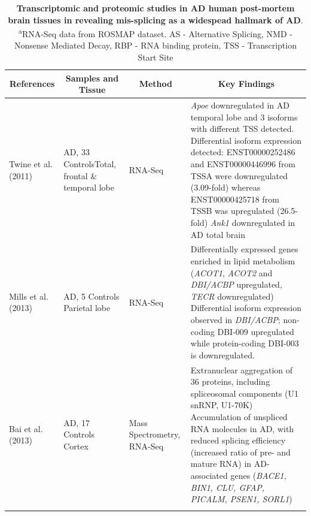 \begin{changemargin}{1.5cm}
	\begin{landscape}
		\small %
		\setlength\tabcolsep{2pt} %
		\renewcommand{\arraystretch}{1}
		\begin{longtable}[c]{p{3cm}p{4cm}p{3cm}p{16cm}}
			\caption[Transcriptomic and Proteomic Studies in AD]%
			{\textbf{Transcriptomic and proteomic studies in AD human post-mortem brain tissues in revealing mis-splicing as a widespead hallmark of AD}. \textsuperscript{a}RNA-Seq data from ROSMAP dataset. AS - Alternative Splicing, NMD - Nonsense Mediated Decay, RBP - RNA binding protein, TSS - Transcription Start Site}
			\label{tab: AS_ADHuman_studies}\\
			
			\toprule
			\multicolumn{1}{c}{References} &
			\multicolumn{1}{c}{Samples and Tissue} &
			\multicolumn{1}{c}{Method} &
			\multicolumn{1}{c}{Key Findings} \\* \midrule
			\endfirsthead
			\endhead
			\bottomrule
			\endfoot
			\endlastfoot
			\centering Twine et al. (2011)\cite{Twine2011} &
			\centering 3 AD, 33 Controls\newline Total, frontal \& temporal lobe &
			\centering RNA-Seq &
			\tabitem \textit{Apoe} downregulated in AD temporal lobe and 3 isoforms with different TSS detected. Differential isoform expression detected: ENST00000252486 and ENST00000446996 from TSSA were downregulated (3.09-fold) whereas ENST00000425718 from TSSB was upregulated (26.5-fold) \newline
			\tabitem \textit{Ank1} downregulated in AD total brain \\
			\hdashline[0.5pt/5pt]
			
			\centering Mills et al. (2013)\cite{Mills2013} &
			\centering 5 AD, 5 Controls \newline Parietal lobe &
			\centering RNA-Seq &
			\tabitem Differentially expressed genes enriched in lipid metabolism (\textit{ACOT1}, \textit{ACOT2} and  \textit{DBI/ACBP} upregulated, \textit{TECR} downregulated) \newline
			\tabitem Differential isoform expression observed in \textit{DBI/ACBP}; non-coding DBI-009 upregulated while protein-coding DBI-003 is downregulated. \\
			\hdashline[0.5pt/5pt]
			
			\centering Bai et al. \newline(2013)\cite{Bai2013} &
			\centering 18 AD, 17 Controls \newline Cortex &
			\centering Mass Spectrometry, RNA-Seq &
			\tabitem Extranuclear aggregation of 36 proteins, including spliceosomal components (U1 snRNP, U1-70K) \newline
			\tabitem Accumulation of unspliced RNA molecules in AD, with reduced splicing efficiency (increased ratio of pre- and mature RNA) in AD-associated genes (\textit{BACE1, BIN1, CLU, GFAP, PICALM, PSEN1, SORL1})  \\
			\hdashline[0.5pt/5pt]
			

\end{longtable}
\end{landscape}
\end{changemargin}
